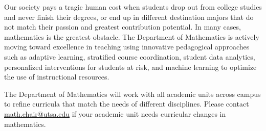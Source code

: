 % 
Our society pays a tragic human cost when students drop out from college studies and never finish their degrees, or end up in different destination majors that do not match their passion and greatest contribution potential. In many cases, mathematics is the greatest obstacle.  The Department of Mathematics is actively moving toward excellence in teaching using innovative pedagogical approaches such as adaptive learning, stratified course coordination, student data analytics, personalized interventions for students at risk, and machine learning to optimize the use of instructional resources. 

The Department of Mathematics will work with all academic units across campus to refine curricula that match the needs of different disciplines. Please contact \href{mailto:math.chair@utsa.edu}{math.chair@utsa.edu} if your academic unit needs curricular changes in mathematics. 




